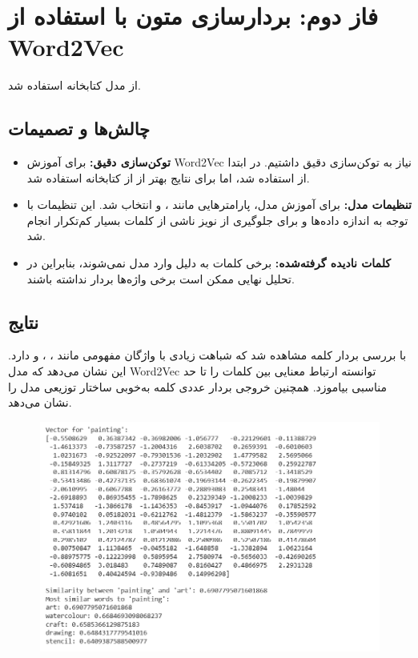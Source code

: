 \documentclass[a4paper,12pt]{article}
\let\nobreaksection\section
\renewcommand{\section}{\nobreaksection}
\begin{document}
	\section{فاز دوم: بردارسازی متون با استفاده از Word2Vec}
	 از مدل  کتابخانه  استفاده شد.
	
	\subsection{چالش‌ها و تصمیمات}
	\begin{itemize}
		\item \textbf{توکن‌سازی دقیق:} برای آموزش Word2Vec نیاز به توکن‌سازی دقیق داشتیم. در ابتدا از  استفاده شد، اما برای نتایج بهتر از  از کتابخانه  استفاده شد.
		
		\item \textbf{تنظیمات مدل:} برای آموزش مدل، پارامترهایی مانند ،  و  انتخاب شد. این تنظیمات با توجه به اندازه داده‌ها و برای جلوگیری از نویز ناشی از کلمات بسیار کم‌تکرار انجام شد.
		
		\item \textbf{کلمات نادیده گرفته‌شده:} برخی کلمات به دلیل  وارد مدل نمی‌شوند، بنابراین در تحلیل نهایی ممکن است برخی واژه‌ها بردار نداشته باشند.
	\end{itemize}
	
	\subsection{نتایج}
	با بررسی بردار کلمه  مشاهده شد که شباهت زیادی با واژگان مفهومی مانند ، ، و  دارد. این نشان می‌دهد که مدل Word2Vec توانسته ارتباط معنایی بین کلمات را تا حد مناسبی بیاموزد. همچنین خروجی بردار عددی کلمه  به‌خوبی ساختار توزیعی مدل را نشان می‌دهد.
		\begin{figure}[h]
		\centering
		\includegraphics[width=1\textwidth]{2-2.png}
	\end{figure}
	\FloatBarrier
	
	
	
\end{document}
